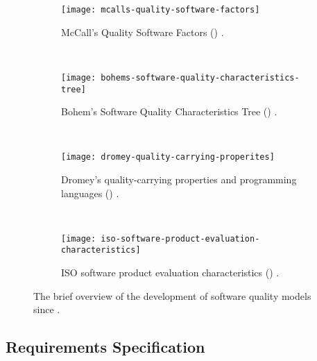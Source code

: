 \begin{figure}[htp]
  \centering
  \begin{subfigure}[b]{0.49\linewidth}
    \centering
    \texttt{[image: mcalls-quality-software-factors]}
    \caption{McCall's Quality Software Factors (\citeyear{McCall:1977wm}) \citep{McCall:1977wm}.}
    \label{fig:lit-review:software-quality:quality-models:development:mccall}
  \end{subfigure}
  ~
  \begin{subfigure}[b]{0.49\linewidth}
    \centering
    \texttt{[image: bohems-software-quality-characteristics-tree]}
    \caption{Bohem's Software Quality Characteristics Tree (\citeyear{Boehm:1978vv}) \citep{Boehm:1978vv}.}
    \label{fig:lit-review:software-quality:quality-models:development:boehm}
  \end{subfigure}
  ~
  \begin{subfigure}[t]{0.49\linewidth}
    \centering
    \texttt{[image: dromey-quality-carrying-properites]}
    \caption{Dromey's quality-carrying properties and programming languages (\citeyear{Dromey:1995wy}) \citep{Dromey:1995wy}.}
    \label{fig:lit-review:software-quality:quality-models:development:dromey}
  \end{subfigure}
  ~
  \begin{subfigure}[t]{0.49\linewidth}
    \centering
    \texttt{[image: iso-software-product-evaluation-characteristics]}
    \caption{ISO software product evaluation characteristics (\citeyear{ISO9126:1999}) \citep{ISO9126:1999}.}
    \label{fig:lit-review:software-quality:quality-models:development:iso}
  \end{subfigure}
  \caption{The brief overview of the development of software quality models since \citeyear{McCall:1977wm}.}
  \label{fig:lit-review:software-quality:quality-models:development}
\end{figure}



\subsection{Requirements Specification}